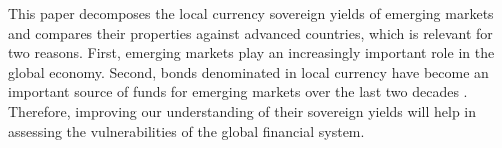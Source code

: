 This paper decomposes the local currency sovereign yields of emerging markets and compares their properties against advanced countries, which is relevant for two reasons.
First, emerging markets play an increasingly important role in the global economy.
Second, bonds denominated in local currency have become an important source of funds for emerging markets over the last two decades \citep{DuSchreger:2016WP,OttonelloPerez:2019,Galli:2020}.
Therefore, improving our understanding of their sovereign yields will help in assessing the vulnerabilities of the global financial system.

